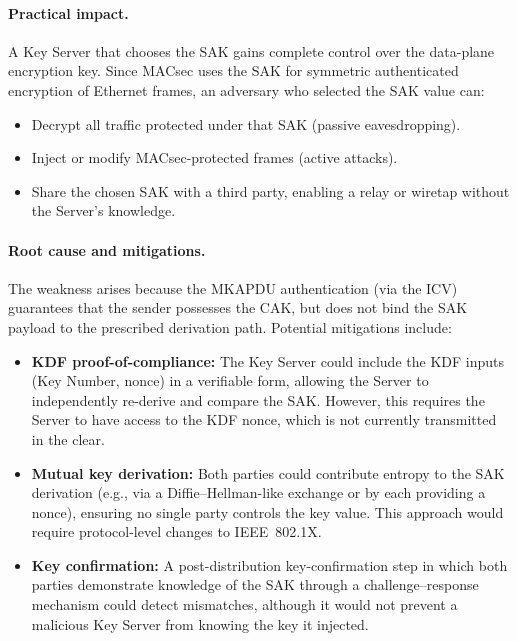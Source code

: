 \begin{sloppypar}
\paragraph{Practical impact.} A Key Server that chooses the SAK gains complete control over the data-plane encryption key. Since MACsec uses the SAK for symmetric authenticated encryption of Ethernet frames, an adversary who selected the SAK value can:
\begin{itemize}
  \item Decrypt all traffic protected under that SAK (passive eavesdropping).
  \item Inject or modify MACsec-protected frames (active attacks).
  \item Share the chosen SAK with a third party, enabling a relay or wiretap without the Server's knowledge.
\end{itemize}
\end{sloppypar}

\begin{sloppypar}
\paragraph{Root cause and mitigations.} The weakness arises because the MKAPDU authentication (via the ICV) guarantees that the sender possesses the CAK, but does not bind the SAK payload to the prescribed derivation path. Potential mitigations include:
\begin{itemize}
  \item \textbf{KDF proof-of-compliance:} The Key Server could include the KDF inputs (Key Number, nonce) in a verifiable form, allowing the Server to independently re-derive and compare the SAK. However, this requires the Server to have access to the KDF nonce, which is not currently transmitted in the clear.
  \item \textbf{Mutual key derivation:} Both parties could contribute entropy to the SAK derivation (e.g., via a Diffie--Hellman-like exchange or by each providing a nonce), ensuring no single party controls the key value. This approach would require protocol-level changes to IEEE~802.1X.
  \item \textbf{Key confirmation:} A post-distribution key-confirmation step in which both parties demonstrate knowledge of the SAK through a challenge--response mechanism could detect mismatches, although it would not prevent a malicious Key Server from knowing the key it injected.
\end{itemize}
\end{sloppypar}


